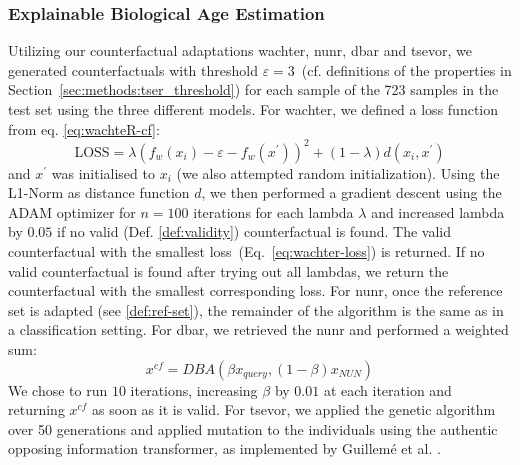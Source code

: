 \subsubsection{Explainable Biological Age Estimation}
Utilizing our counterfactual adaptations \gls{wachter}, \gls{nunr}, \gls{dbar} and \gls{tsevor}, we generated counterfactuals with threshold $\varepsilon=3$~(cf. definitions of the properties in Section~\ref{sec:methods:tser_threshold}) for each sample of the 723 samples in the test set using the three different models.
For \gls{wachter}, we defined a loss function from eq. \ref{eq:wachteR-cf}:
\begin{equation}
    \label{eq:wachter-loss}
    \text{LOSS} = \lambda\left(f_{w}\left(x_{i}\right)-\varepsilon -f_{w}\left(x^{\prime}\right)\right)^{2}+\left(1-\lambda\right)d\left(x_{i}, x^{\prime}\right)
\end{equation}
and $x^{\prime}$ was initialised  to $x_{i}$ (we also attempted random initialization). 
Using the L1-Norm as distance function $d$, we then performed a gradient descent using the ADAM \cite{kingma_adam_2017} optimizer for $n=100$ iterations for each lambda $\lambda$ and increased lambda by $0.05$ if no valid (Def. \ref{def:validity}) counterfactual is found. The valid counterfactual with the smallest loss~(Eq.~\ref{eq:wachter-loss}) is returned. If no valid counterfactual is found after trying out all lambdas, we return the counterfactual with the smallest corresponding loss.
For \gls{nunr}, once the reference set is adapted (see \ref{def:ref-set}), the remainder of the algorithm is the same as in a classification setting.
For \gls{dbar}, we retrieved the \gls{nunr} and performed a weighted sum: 
\begin{equation}
    x^{cf} = DBA\left(\beta x_{query}, \left(1-\beta\right)x_{NUN} \right)
\end{equation}
We chose to run $10$ iterations, increasing $\beta$ by $0.01$ at each iteration and returning $x^{cf}$ as soon as it is valid. 
For \gls{tsevor}, we applied the genetic algorithm over 50 generations and applied mutation to the individuals using the authentic opposing information transformer, as implemented by Guillemé et al. \cite{guilleme_agnostic_2019}.


